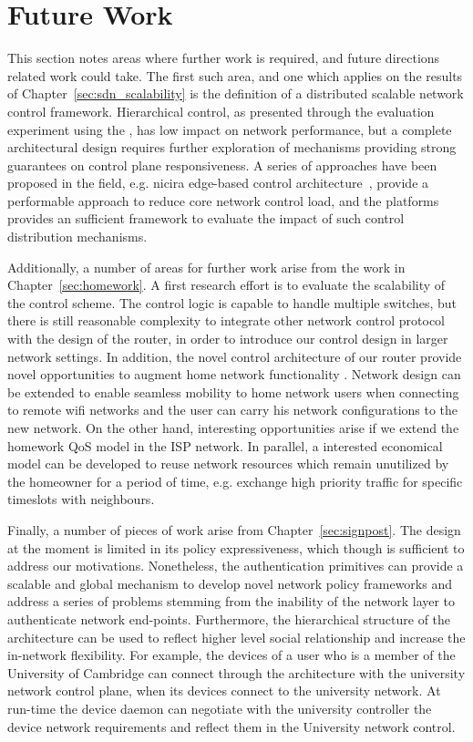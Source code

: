 \section{Future Work}
  
This section notes areas where further work is required, and future directions
related work could take. The first such area, and one which applies on the
results of Chapter~\ref{sec:sdn_scalability} is the definition of a distributed
scalable network control framework. Hierarchical control, as presented through
the evaluation experiment using the \sdnsim, has low impact on network
performance, but a complete architectural design requires further exploration of
mechanisms providing strong guarantees on control plane responsiveness. A series
of approaches have been proposed in the field, e.g. nicira edge-based control
architecture~\cite{koponen12}, provide a performable approach to reduce core
network control load, and the \sdnsim platforms provides an sufficient framework
to evaluate the impact of such control distribution mechanisms.

Additionally, a number of areas for further work arise from the work in
Chapter~\ref{sec:homework}. A first research effort is to evaluate the
scalability of the control scheme. The control logic is capable to handle
multiple switches, but there is still reasonable complexity to integrate other
network control protocol with the design of the router, in order to introduce
our control design in larger network settings. In addition, the novel control
architecture of our router provide novel opportunities to augment home network
functionality . Network design can be extended to enable seamless mobility to
home network users when connecting to remote wifi networks and the user can
carry his network configurations to the new network. On the other hand,
interesting opportunities arise if we extend the homework QoS model in the ISP
network. In parallel, a interested economical model can be developed to reuse
network resources  which remain unutilized by the homeowner for a period of
time, e.g. exchange high priority traffic for specific timeslots with
neighbours. 

Finally, a number of pieces of work arise from Chapter~\ref{sec:signpost}.  The
\signpost design at the moment is limited in  its policy expressiveness, which
though is sufficient to address our motivations.  Nonetheless, the
authentication primitives can provide a scalable and global mechanism to develop
novel network policy frameworks and address a series of problems stemming from
the inability of the network layer to authenticate network end-points.
Furthermore, the hierarchical structure of the \signpost architecture can be
used to reflect higher level social relationship and increase the in-network
flexibility. For example, the devices of a user who is a member of the University
of Cambridge can connect through the \signpost architecture with the university
network control plane,  when its devices connect to the university network. 
At run-time the device \signpost daemon can negotiate with the university
\signpost controller the device network requirements and reflect them in the
University network control. 
